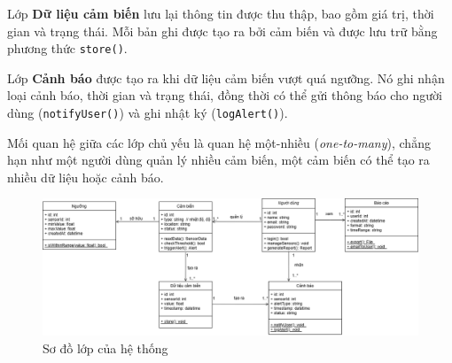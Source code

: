Lớp \textbf{Dữ liệu cảm biến} lưu lại thông tin được thu thập, bao gồm giá trị, thời gian và trạng thái. Mỗi bản ghi được tạo ra bởi cảm biến và được lưu trữ bằng phương thức \texttt{store()}.

Lớp \textbf{Cảnh báo} được tạo ra khi dữ liệu cảm biến vượt quá ngưỡng. Nó ghi nhận loại cảnh báo, thời gian và trạng thái, đồng thời có thể gửi thông báo cho người dùng (\texttt{notifyUser()}) và ghi nhật ký (\texttt{logAlert()}).

Mối quan hệ giữa các lớp chủ yếu là quan hệ một-nhiều (\textit{one-to-many}), chẳng hạn như một người dùng quản lý nhiều cảm biến, một cảm biến có thể tạo ra nhiều dữ liệu hoặc cảnh báo.

\begin{figure}[H]
    \centering
    \includegraphics[width=\textwidth]{figures/class_diagram.png}
    \caption{Sơ đồ lớp của hệ thống}
    \label{fig:class_diagram}
\end{figure}